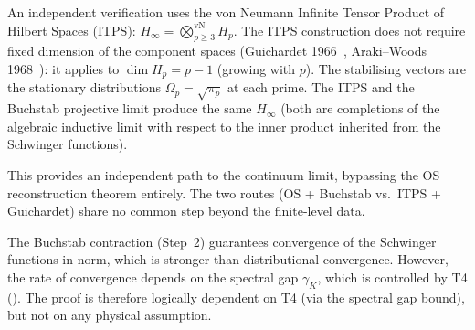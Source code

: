 \documentclass[12pt,a4paper]{article}
\begin{document}
\begin{remark}
\label{rem:ITPS}
An independent verification uses the von Neumann Infinite Tensor
Product of Hilbert Spaces (ITPS):
$H_\infty = \bigotimes_{p \geq 3}^{\mathrm{vN}} H_p$.
The ITPS construction does not require fixed dimension of the
component spaces (Guichardet 1966~\cite{Guichardet1966},
Araki--Woods 1968~\cite{ArakiWoods1968}): it applies to
$\dim H_p = p - 1$ (growing with $p$).
The stabilising vectors are the stationary distributions
$\Omega_p = \sqrt{\pi_p}$ at each prime.
The ITPS and the Buchstab projective limit produce the same
$H_\infty$ (both are completions of the algebraic inductive limit
with respect to the inner product inherited from the Schwinger
functions).

This provides an independent path to the continuum limit, bypassing
the OS reconstruction theorem entirely.  The two routes (OS + Buchstab
vs.\ ITPS + Guichardet) share no common step beyond the finite-level
data.
\end{remark}

\begin{remark}
\label{rem:os_subtlety}
The Buchstab contraction (Step~2) guarantees convergence of the
Schwinger functions in norm, which is stronger than distributional
convergence.  However, the rate of convergence depends on the
spectral gap $\gamma_K$, which is controlled by T4
(\cite{companion_M3}).  The proof is therefore logically
dependent on T4 (via the spectral gap bound), but not on any
physical assumption.
\end{remark}




\end{document}
